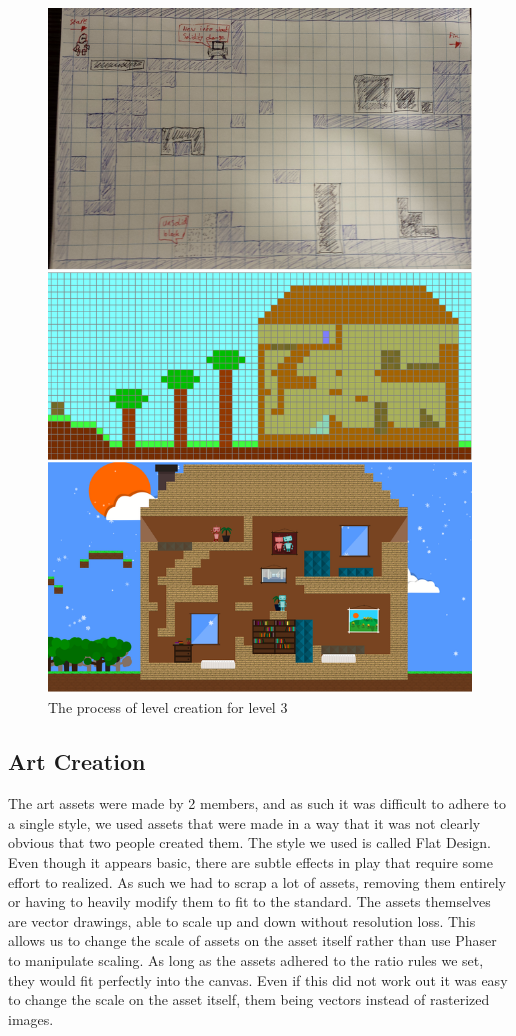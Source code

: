 \documentclass[a4paper,twoside,12pt]{article}
\begin{document}
\begin{figure}[H]
\includegraphics[scale=0.3]{levelSketchAndDesign.png}
\caption{The process of level creation for level 3}
\end{figure}

\subsection{Art Creation}
The art assets were made by 2 members, and as such it was difficult to adhere to a single style, we used assets that were made in a way that it was not clearly obvious that two people created them. The style we used is called Flat Design. Even though it appears basic, there are subtle effects in play that require some effort to realized. As such we had to scrap a lot of assets, removing them entirely or having to heavily modify them to fit to the standard. The assets themselves are vector drawings, able to scale up and down without resolution loss. This allows us to
change the scale of assets on the asset itself rather than use Phaser to manipulate scaling. As long as the assets adhered to the ratio rules we set, they would fit perfectly into the canvas. Even if this did not work out it was easy to change the scale on the asset itself, them being vectors instead of rasterized images.
\end{document}
